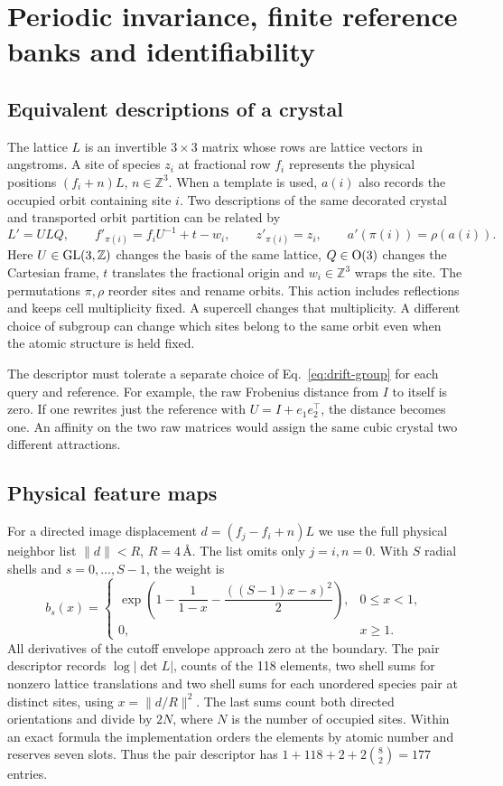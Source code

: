 \section{Periodic invariance, finite reference banks and identifiability}\label{app:proofs}
\label{app:periodic-field}

\subsection{Equivalent descriptions of a crystal}
The lattice \(L\) is an invertible \(3\times3\) matrix whose rows are lattice vectors in angstroms. A site of species \(z_i\) at fractional row \(f_i\) represents the physical positions \((f_i+n)L\), \(n\in\mathbb Z^3\). When a template is used, \(a(i)\) also records the occupied orbit containing site \(i\). Two descriptions of the same decorated crystal and transported orbit partition can be related by
\begin{equation}
 L'=ULQ,\qquad f'_{\pi(i)}= f_iU^{-1}+t-w_i,\qquad
 z'_{\pi(i)}=z_i,\qquad a'(\pi(i))=\rho(a(i)).
 \label{eq:drift-group}
\end{equation}
Here \(U\in{\rm GL}(3,\mathbb Z)\) changes the basis of the same lattice, \(Q\in{\rm O}(3)\) changes the Cartesian frame, \(t\) translates the fractional origin and \(w_i\in\mathbb Z^3\) wraps the site. The permutations \(\pi,\rho\) reorder sites and rename orbits. This action includes reflections and keeps cell multiplicity fixed. A supercell changes that multiplicity. A different choice of subgroup can change which sites belong to the same orbit even when the atomic structure is held fixed.

The descriptor must tolerate a separate choice of Eq.~\eqref{eq:drift-group} for each query and reference. For example, the raw Frobenius distance from \(I\) to itself is zero. If one rewrites just the reference with \(U=I+e_1e_2^\top\), the distance becomes one. An affinity on the two raw matrices would assign the same cubic crystal two different attractions.

\subsection{Physical feature maps}
For a directed image displacement \(d=(f_j-f_i+n)L\) we use the full physical neighbor list \(\|d\|<R\), \(R=4\,\text{\AA}\). The list omits only \(j=i,n=0\). With \(S\) radial shells and \(s=0,\ldots,S-1\), the weight is
\[
 b_s(x)=\begin{cases}
 \exp\!\left(1-\dfrac{1}{1-x}-\dfrac{((S-1)x-s)^2}{2}\right),&0\leq x<1,\\[4pt]
 0,&x\geq1 .
 \end{cases}
\]
All derivatives of the cutoff envelope approach zero at the boundary. The pair descriptor records \(\log|\det L|\), counts of the 118 elements, two shell sums for nonzero lattice translations and two shell sums for each unordered species pair at distinct sites, using \(x=\|d/R\|^2\). The last sums count both directed orientations and divide by \(2N\), where \(N\) is the number of occupied sites. Within an exact formula the implementation orders the elements by atomic number and reserves seven slots. Thus the pair descriptor has \(1+118+2+2\binom{8}{2}=177\) entries.

